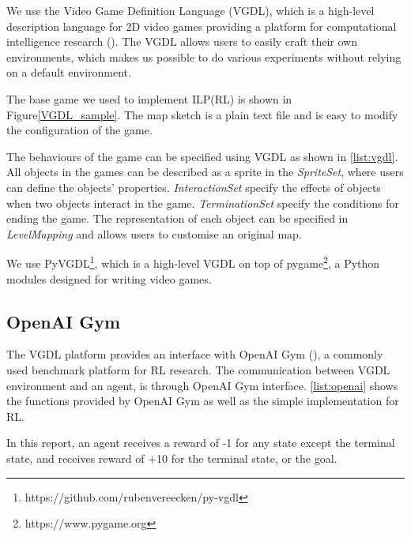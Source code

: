 We use the Video Game Definition Language (VGDL), which is a high-level description language for 2D video games providing a platform for computational intelligence research (\cite{schaul2013video}).
The VGDL allows users to easily craft their own environments, 
which makes us possible to do various experiments without relying on a default environment.

The base game we used to implement ILP(RL) is shown in Figure\ref{VGDL_sample}.
The map sketch is a plain text file and is easy to modify the configuration of the game.



The behaviours of the game can be specified using VGDL as shown in \ref{list:vgdl}. 
All objects in the games can be described as a sprite in the \textit{SpriteSet}, where users can define the objects' properties.
\textit{InteractionSet} specify the effects of objects when two objects interact in the game.
\textit{TerminationSet} specify the conditions for ending the game.
The representation of each object can be specified in \textit{LevelMapping} and allows users to customise an original map.

We use PyVGDL\footnote{https://github.com/rubenvereecken/py-vgdl}, which is a high-level VGDL on top of pygame\footnote{https://www.pygame.org}, 
a Python modules designed for writing video games.

\subsection{OpenAI Gym}
\label{sebseq:openai_gym}
The VGDL platform provides an interface with OpenAI Gym (\cite{Brockman2016}), a commonly used benchmark platform for RL research.
The communication between VGDL environment and an agent, is through OpenAI Gym interface. 
\ref{list:openai} shows the functions provided by OpenAI Gym as well as the simple implementation for RL. 

In this report, an agent receives a reward of -1 for any state except the terminal state, and receives reward of +10 for the terminal state, or the goal.




